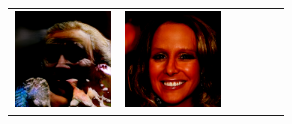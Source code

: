 \documentclass{article}
\newcommand{\pganw}{1.0in}
\begin{document}
\begin{table}[htbp]
\begin{center}
\begin{tabular}{cc|cc|cc}
\includegraphics[width=\pganw]{figures/pgan/8_base_raw_reject.png} &
\includegraphics[width=\pganw]{figures/pgan/9_base_raw_base.png} &

\end{tabular}
\end{center}
\end{table}
\end{document}
